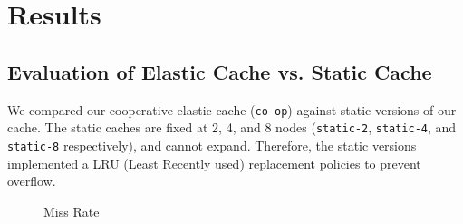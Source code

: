 
\section{Results} %
\label{sec:results_indexing}

\subsection{Evaluation of Elastic Cache vs. Static Cache} %
\label{sub:evaluation_elastic_static}
We compared our cooperative elastic cache ({\tt co-op}) against static versions
of our cache. The static caches are fixed at 2, 4, and 8 nodes ({\tt static-2},
{\tt static-4}, and {\tt static-8} respectively), and cannot expand. Therefore,
the static versions implemented a LRU (Least Recently used) replacement
policies to prevent overflow.

\begin{figure}[htp]
\begin{center}
   	\caption{Miss Rate}
\end{center}
\end{figure}

